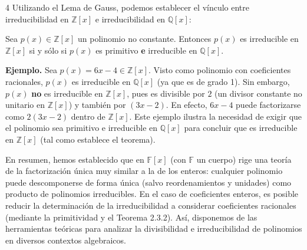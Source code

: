 \documentclass[11pt]{article}
\theoremstyle{plain}
\theoremstyle{definition}
\theoremstyle{definition}
\begin{document}
\begin{multicols}{4}
Utilizando el Lema de Gauss, podemos establecer el vínculo entre irreducibilidad en $\mathbb{Z}[x]$ e irreducibilidad en $\mathbb{Q}[x]$:

\begin{tcolorbox}[colback=red!5!white,colframe=red!75!black,title=\textbf{Teorema 2.3.2}]
Sea $p(x) \in \mathbb{Z}[x]$ un polinomio no constante. Entonces $p(x)$ es irreducible en $\mathbb{Z}[x]$ si y sólo si $p(x)$ es primitivo \textbf{e} irreducible en $\mathbb{Q}[x]$.
\end{tcolorbox}

\noindent\textbf{Ejemplo.} Sea $p(x) = 6x - 4 \in \mathbb{Z}[x]$. Visto como polinomio con coeficientes racionales, $p(x)$ es irreducible en $\mathbb{Q}[x]$ (ya que es de grado 1). Sin embargo, $p(x)$ \textbf{no} es irreducible en $\mathbb{Z}[x]$, pues es divisible por $2$ (un divisor constante no unitario en $\mathbb{Z}[x]$) y también por $(3x - 2)$. En efecto, $6x - 4$ puede factorizarse como $2(3x - 2)$ dentro de $\mathbb{Z}[x]$. Este ejemplo ilustra la necesidad de exigir que el polinomio sea primitivo e irreducible en $\mathbb{Q}[x]$ para concluir que es irreducible en $\mathbb{Z}[x]$ (tal como establece el teorema).

En resumen, hemos establecido que en $\mathbb{F}[x]$ (con $\mathbb{F}$ un cuerpo) rige una teoría de la factorización única muy similar a la de los enteros: cualquier polinomio puede descomponerse de forma única (salvo reordenamientos y unidades) como producto de polinomios irreducibles. En el caso de coeficientes enteros, es posible reducir la determinación de la irreducibilidad a considerar coeficientes racionales (mediante la primitividad y el Teorema 2.3.2). Así, disponemos de las herramientas teóricas para analizar la divisibilidad e irreducibilidad de polinomios en diversos contextos algebraicos.
\end{multicols}
\end{document}
